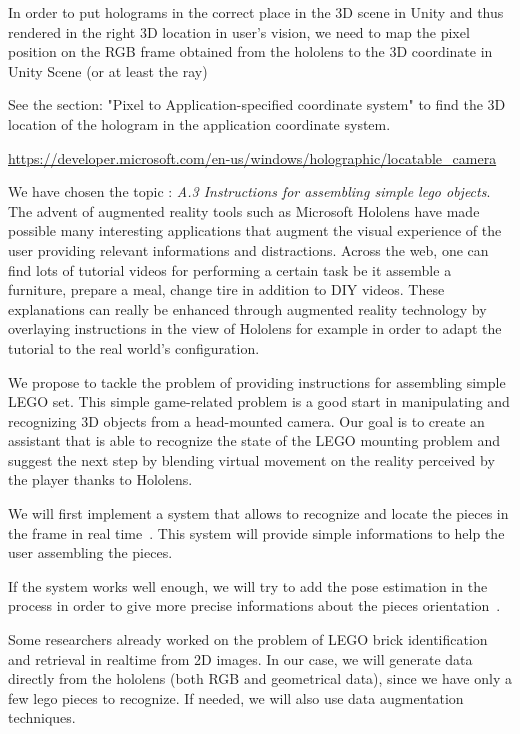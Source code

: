 \documentclass[a4paper,10pt]{article}
\begin{document}
In order to put holograms in the correct place in the 3D scene in Unity and thus rendered in the right 3D location in user's vision, we need to map the pixel position on the RGB frame obtained from the hololens to the 3D coordinate in Unity Scene (or at least the ray)

See the section: "Pixel to Application-specified coordinate system" to find the 3D location of the hologram in the application coordinate system.

\url{https://developer.microsoft.com/en-us/windows/holographic/locatable_camera}
\newpage

We have chosen the topic : \emph{A.3 Instructions for assembling simple lego objects}.
\smallbreak
The advent of augmented reality tools such as Microsoft Hololens have made possible many interesting 
applications that augment the visual experience of the user providing relevant informations and 
distractions. Across the web, one can find lots of tutorial videos for performing a certain task be it 
assemble a furniture, prepare a meal, change tire in addition to DIY videos. These explanations can 
really be enhanced through augmented reality technology by overlaying instructions in the view of Hololens 
for example in order to adapt the tutorial to the real world’s configuration. 
\smallbreak

We propose to tackle the problem of providing instructions for assembling simple LEGO set. This simple 
game-related problem is a good start in manipulating and recognizing 3D objects from a head-mounted camera. 
Our goal is to create an assistant that is able to recognize the state of the LEGO mounting problem and 
suggest the next step by blending virtual movement on the reality perceived by the player thanks to 
Hololens.

\smallbreak

We will first implement a system that allows to recognize and locate the pieces in the frame in real time~\cite{redmon_you_2015}. 
This system will provide simple informations to help the user assembling the pieces.

If the system works well enough, we will try to add the pose estimation in the process in order to give 
more precise informations about the pieces orientation~\cite{wohlhart_learning_2015}.

\smallbreak
Some researchers already worked on the problem of LEGO brick identification and retrieval in realtime from 
2D images\cite{botha_realtime_2009}. In our case, we will generate data directly from the hololens (both 
RGB and geometrical data), since we have only a few lego pieces to recognize. If needed, we will also use 
data augmentation techniques. 
 
\end{document}
